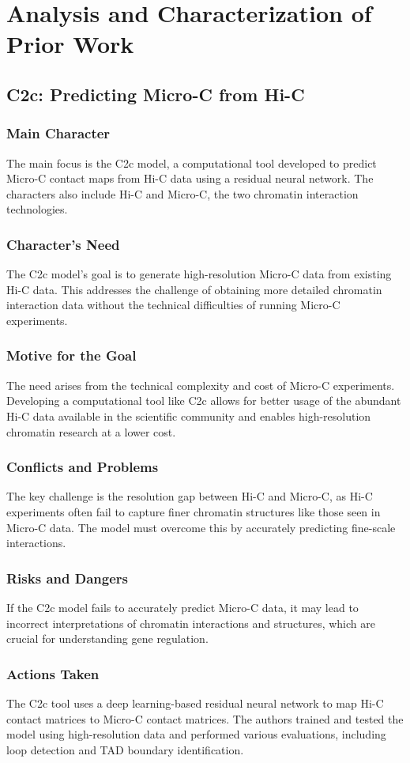 \section{Analysis and Characterization of Prior Work}
\subsection{C2c: Predicting Micro-C from Hi-C}
\subsubsection{Main Character}
The main focus is the C2c model, a computational tool developed to predict Micro-C contact maps from Hi-C data using a residual neural network. The characters also include Hi-C and Micro-C, the two chromatin interaction technologies.
\subsubsection{Character's Need}
The C2c model's goal is to generate high-resolution Micro-C data from existing Hi-C data. This addresses the challenge of obtaining more detailed chromatin interaction data without the technical difficulties of running Micro-C experiments.
\subsubsection{Motive for the Goal}
The need arises from the technical complexity and cost of Micro-C experiments. Developing a computational tool like C2c allows for better usage of the abundant Hi-C data available in the scientific community and enables high-resolution chromatin research at a lower cost.
\subsubsection{Conflicts and Problems}
The key challenge is the resolution gap between Hi-C and Micro-C, as Hi-C experiments often fail to capture finer chromatin structures like those seen in Micro-C data. The model must overcome this by accurately predicting fine-scale interactions.
\subsubsection{Risks and Dangers}
If the C2c model fails to accurately predict Micro-C data, it may lead to incorrect interpretations of chromatin interactions and structures, which are crucial for understanding gene regulation.
\subsubsection{Actions Taken}
The C2c tool uses a deep learning-based residual neural network to map Hi-C contact matrices to Micro-C contact matrices. The authors trained and tested the model using high-resolution data and performed various evaluations, including loop detection and TAD boundary identification.
